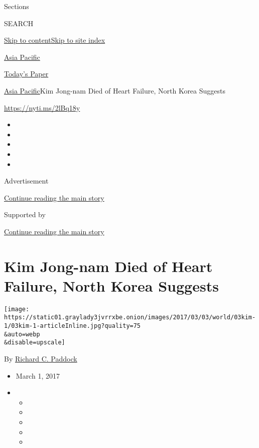Sections

SEARCH

\protect\hyperlink{site-content}{Skip to
content}\protect\hyperlink{site-index}{Skip to site index}

\href{https://www.nytimes3xbfgragh.onion/section/world/asia}{Asia
Pacific}

\href{https://myaccount.nytimes3xbfgragh.onion/auth/login?response_type=cookie\&client_id=vi}{}

\href{https://www.nytimes3xbfgragh.onion/section/todayspaper}{Today's
Paper}

\href{/section/world/asia}{Asia Pacific}\textbar{}Kim Jong-nam Died of
Heart Failure, North Korea Suggests

\url{https://nyti.ms/2lBq18y}

\begin{itemize}
\item
\item
\item
\item
\item
\end{itemize}

Advertisement

\protect\hyperlink{after-top}{Continue reading the main story}

Supported by

\protect\hyperlink{after-sponsor}{Continue reading the main story}

\hypertarget{kim-jong-nam-died-of-heart-failure-north-korea-suggests}{%
\section{Kim Jong-nam Died of Heart Failure, North Korea
Suggests}\label{kim-jong-nam-died-of-heart-failure-north-korea-suggests}}

\texttt{[image: https://static01.graylady3jvrrxbe.onion/images/2017/03/03/world/03kim-1/03kim-1-articleInline.jpg?quality=75\\\&auto=webp\\\&disable=upscale]}

By
\href{https://www.nytimes3xbfgragh.onion/by/richard-c-paddock}{Richard
C. Paddock}

\begin{itemize}
\item
  March 1, 2017
\item
  \begin{itemize}
  \item
  \item
  \item
  \item
  \item
  \end{itemize}
\end{itemize}

